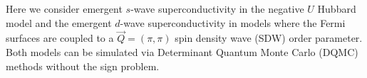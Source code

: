 \documentclass[amsmath,amssymb, aps, prl, twocolumn]{revtex4-1}
\begin{document}
Here we consider emergent $s$-wave superconductivity in the negative $U$ Hubbard model\cite{Scalettar1989, Scalapino1992} and the emergent $d$-wave superconductivity in models where the Fermi surfaces are coupled to a $\vec Q=(\pi, \pi)$ spin density wave (SDW) order parameter\cite{Erez2016}. Both models can be simulated via Determinant Quantum Monte Carlo (DQMC) methods without the sign problem. %
\end{document}
